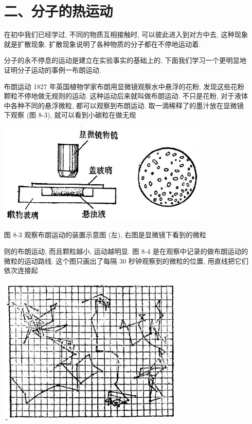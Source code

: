 \documentclass[10pt]{article}
\begin{document}
\section*{二、分子的热运动}

在初中我们已经学过, 不同的物质互相接触时, 可以彼此进入到对方中去, 这种现象就是扩散现象. 扩散现象说明了各种物质的分子都在不停地运动着.

分子的永不停息的运动是建立在实验事实的基础上的, 下面我们学习一个更明显地证明分子运动的事例一布朗运动.

布朗运动 1827 年英国植物学家布朗用显微镜观察水中悬浮的花粉, 发现这些花粉颗粒不停地做无规则的运动. 这种运动后来就叫做布朗运动. 不只是花粉, 对于液体中各种不同的悬浮微粒, 都可以观察到布朗运动. 取一滴稀释了的墨汁放在显微镜下观察 (图 8-3), 就可以看到小碳粒在做无规

\begin{center}
\includegraphics[max width=0.8\textwidth]{images/01912d55-147c-70aa-b0e0-1782a122f948_237_753444.jpg}
\end{center}

图 8-3 观察布朗运动的装置示意图 (左), 右图是显微镜下看到的微粒

则的布朗运动, 而且颗粒越小, 运动越明显. 图 8-4 是在观察中记录的做布朗运动的微粒的运动路线. 这个图只画出了每隔 30 秒钟观察到的微粒的位置, 用直线把它们依次连接起

\begin{center}
\includegraphics[max width=0.7\textwidth]{images/01912d55-147c-70aa-b0e0-1782a122f948_238_490327.jpg}
\end{center}
\end{document}
